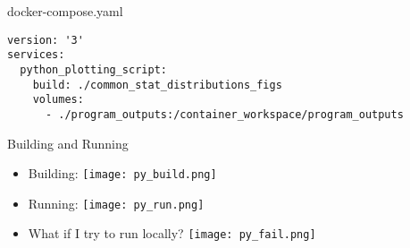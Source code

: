 \documentclass{beamer}
\begin{document}
\begin{frame}[fragile]{docker-compose.yaml}
    \begin{verbatim}
version: '3'
services:
  python_plotting_script:
    build: ./common_stat_distributions_figs
    volumes:
      - ./program_outputs:/container_workspace/program_outputs
    \end{verbatim}
\end{frame}

\begin{frame}{Building and Running}
    \begin{itemize}
        \item Building:
        \texttt{[image: py\_build.png]} 
        \item Running:
        \texttt{[image: py\_run.png]}
        \item What if I try to run locally?
        \texttt{[image: py\_fail.png]}
    \end{itemize}
\end{frame}
\end{document}
